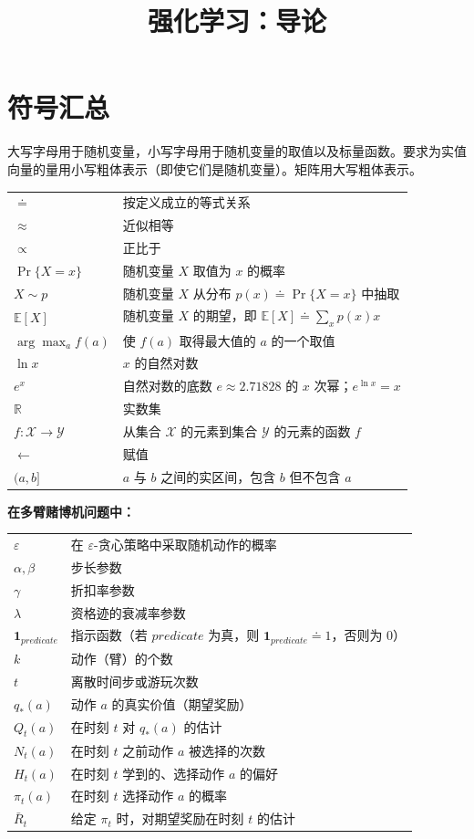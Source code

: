 \documentclass[UTF8,12pt,a4paper,fontset=fandol]{ctexart}
\title{强化学习：导论}
\author{}
\date{}
\begin{document}
\maketitle

\section*{符号汇总}

大写字母用于随机变量，小写字母用于随机变量的取值以及标量函数。要求为实值向量的量用小写粗体表示（即使它们是随机变量）。矩阵用大写粗体表示。

\begin{longtable}{p{}p{}}
$\doteq$ & 按定义成立的等式关系 \\
$\approx$ & 近似相等 \\
$\propto$ & 正比于 \\
$\Pr\{X=x\}$ & 随机变量 $X$ 取值为 $x$ 的概率 \\
$X\sim p$ & 随机变量 $X$ 从分布 $p(x)\doteq\Pr\{X=x\}$ 中抽取 \\
$\mathbb{E}[X]$ & 随机变量 $X$ 的期望，即 $\mathbb{E}[X]\doteq\sum_x p(x)x$ \\
$\arg\max_a f(a)$ & 使 $f(a)$ 取得最大值的 $a$ 的一个取值 \\
$\ln x$ & $x$ 的自然对数 \\
$e^x$ & 自然对数的底数 $e\approx2.71828$ 的 $x$ 次幂；$e^{\ln x}=x$ \\
$\mathbb{R}$ & 实数集 \\
$f:\mathcal{X}\to\mathcal{Y}$ & 从集合 $\mathcal{X}$ 的元素到集合 $\mathcal{Y}$ 的元素的函数 $f$ \\
$\leftarrow$ & 赋值 \\
$(a,b]$ & $a$ 与 $b$ 之间的实区间，包含 $b$ 但不包含 $a$ \\
\end{longtable}

\noindent\textbf{在多臂赌博机问题中：}
\begin{longtable}{p{}p{}}
$\varepsilon$ & 在 $\varepsilon$-贪心策略中采取随机动作的概率 \\
$\alpha,\beta$ & 步长参数 \\
$\gamma$ & 折扣率参数 \\
$\lambda$ & 资格迹的衰减率参数 \\
$\mathbf{1}_{predicate}$ & 指示函数（若 $predicate$ 为真，则 $\mathbf{1}_{predicate}\doteq1$，否则为 $0$） \\
$k$ & 动作（臂）的个数 \\
$t$ & 离散时间步或游玩次数 \\
$q_*(a)$ & 动作 $a$ 的真实价值（期望奖励） \\
$Q_t(a)$ & 在时刻 $t$ 对 $q_*(a)$ 的估计 \\
$N_t(a)$ & 在时刻 $t$ 之前动作 $a$ 被选择的次数 \\
$H_t(a)$ & 在时刻 $t$ 学到的、选择动作 $a$ 的偏好 \\
$\pi_t(a)$ & 在时刻 $t$ 选择动作 $a$ 的概率 \\
$\bar R_t$ & 给定 $\pi_t$ 时，对期望奖励在时刻 $t$ 的估计 \\
\end{longtable}
\end{document}
